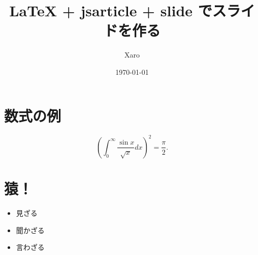 \documentclass[a4j,papersize,disablejfam,slide,36pt]{jsarticle}
\begin{document}
\title{LaTeX + jsarticle + slide でスライドを作る}
\author{Xaro}
\date{\today}
\maketitle
\section{数式の例}
\begin{equation}
\left( \int_{0}^{\infty} \frac{\sin x}{\sqrt{x}} dx \right)^{2} = \frac{\pi}{2}.
\end{equation}

\newpage
\section{猿！}
\begin{itemize}
\item 見ざる
\item 聞かざる
\item 言わざる
\end{itemize}
\end{document}
